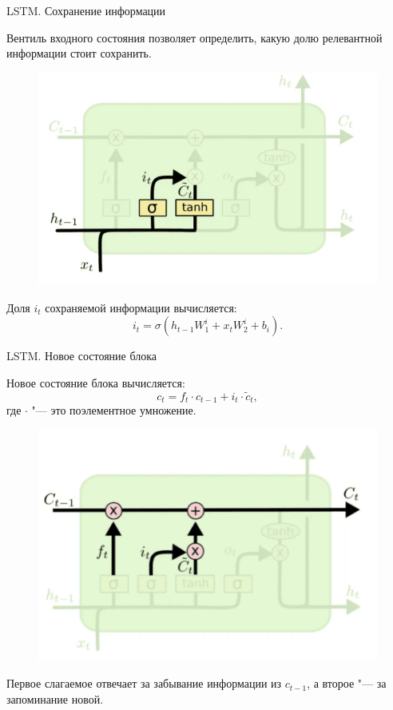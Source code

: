 \documentclass[notheorems, handout, 10pt]{beamer}
\begin{document}
	\begin{frame}{LSTM. Сохранение информации}
		
		Вентиль входного состояния позволяет определить, какую долю релевантной информации стоит сохранить.
		
		\begin{figure}[H]
			\includegraphics[width=0.5\linewidth]{images/8}
		\end{figure}
		
		Доля $i_t$ сохраняемой информации вычисляется: $$i_t=\sigma(h_{t-1}W_1^i+x_tW_2^i+b_i).$$
	
		\note{}
		
	\end{frame}
	
	\begin{frame}{LSTM. Новое состояние блока}
		
		Новое состояние блока вычисляется: $$c_t=f_t\cdot c_{t-1} + i_t \cdot \tilde{c}_t,$$ где $\cdot$ "--- это поэлементное умножение. 
	
		\begin{figure}[H]
			\includegraphics[width=0.5\linewidth]{images/9}
		\end{figure}
		
		Первое слагаемое отвечает за забывание информации из $c_{t-1}$, а второе "--- за запоминание новой.
		
		\note{}
		
	\end{frame}
	
\end{document}
